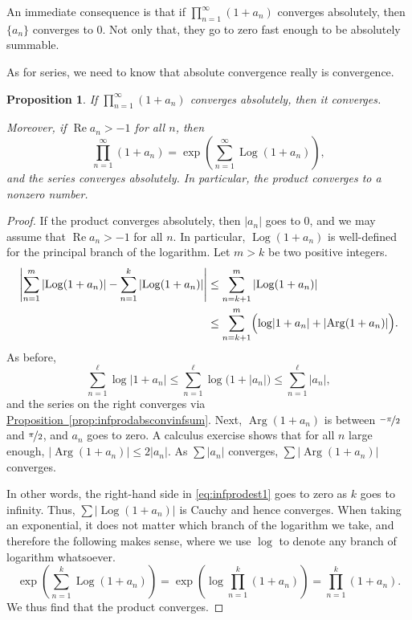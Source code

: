 \documentclass[12pt,openany]{book}
\renewcommand{\Re}{\operatorname{Re}}
\newcommand{\Arg}{\operatorname{Arg}}
\newcommand{\Log}{\operatorname{Log}}
\newcommand{\sabs}[1]{\lvert {#1} \rvert}
\newcommand{\babs}[1]{\bigl\lvert {#1} \bigr\rvert}
\newcommand{\abs}[1]{\left\lvert {#1} \right\rvert}
\theoremstyle{plain}
\newtheorem{prop}[thm]{Proposition}
\theoremstyle{remark}
\theoremstyle{definition}
\theoremstyle{exercise}
\theoremstyle{example}
\newcommand{\propref}[1]{\hyperref[#1]{Proposition~\ref*{#1}}}
\begin{document}
An immediate consequence is that if 
$\prod_{n=1}^\infty (1+a_n)$ converges absolutely, then
$\{ a_n \}$ converges to $0$.  Not only that, they
go to zero fast enough to be absolutely summable.

As for series, we need to know that absolute convergence really is convergence.

\begin{prop} \label{prop:infproductwithlogs}
If $\prod_{n=1}^\infty (1+a_n)$ converges absolutely, then it converges.

Moreover, if $\Re a_n > -1$ for all $n$, then 
\begin{equation*}
\prod_{n=1}^\infty (1+a_n)
=
\exp\left(
\sum_{n=1}^\infty \Log(1+a_n)
\right),
\end{equation*}
and the series converges absolutely.  In particular, the product
converges to a nonzero number.
\end{prop}

\begin{proof}
If the product converges absolutely, then $\sabs{a_n}$ goes to $0$, and we
may assume that $\Re a_n > -1$ for all $n$.  In particular,
$\Log (1+a_n)$ is well-defined for the principal branch of the logarithm.
Let $m > k$ be two positive integers.
\begin{equation} \label{eq:infprodest1}
\begin{split}
\abs{
\sum_{n=1}^m 
\abs{\Log (1+a_n)}
-
\sum_{n=1}^k 
\abs{\Log (1+a_n)}
}
& \leq
\sum_{n=k+1}^m 
\abs{
\Log (1+a_n)
}
\\
& \leq
\sum_{n=k+1}^m 
\Bigl(
\log \sabs{1+a_n}
+
\abs{ \Arg (1+a_n)}
\Bigr) .
\end{split}
\end{equation}
As before,
\begin{equation*}
\sum_{n=1}^\ell \log \sabs{1+a_n} \leq
\sum_{n=1}^\ell \log \bigl(1+\sabs{a_n}\bigr)
\leq
\sum_{n=1}^\ell \sabs{a_n} ,
\end{equation*}
and the series on the right converges via \propref{prop:infprodabsconvinfsum}.
Next, $\Arg(1+a_n)$ is between $\nicefrac{-\pi}{2}$ and
$\nicefrac{\pi}{2}$, and $a_n$ goes to zero.  A calculus exercise
shows that for all $n$ large
enough, $\babs{\Arg(1+a_n)} \leq 2\sabs{a_n}$.  As $\sum
\sabs{a_n}$ converges, 
$\sum \babs{\Arg (1+a_n)}$ converges.

In other words, the right-hand side in \eqref{eq:infprodest1} goes to zero
as $k$ goes to infinity.  Thus, $\sum \babs{\Log(1+a_n)}$ is Cauchy and hence
converges.  When taking an exponential, it does not matter which branch of
the logarithm we take, and therefore the following makes sense, where we use
$\log$ to denote any branch of logarithm whatsoever.
\begin{equation*}
\exp\left(
\sum_{n=1}^k \Log(1+a_n)
\right)
=
\exp\left(
\log \prod_{n=1}^k (1+a_n)
\right)
=
\prod_{n=1}^k (1+a_n) .
\end{equation*}
We thus find that the product converges.
\end{proof}
\end{document}
